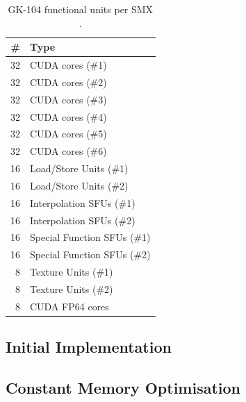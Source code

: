 \documentclass[11pt, oneside, a4paper]{article}
\begin{document}
\begin{table}[tb]
	\caption{GK-104 functional units per SMX \cite{Anand}.}
	\label{tab:funcunits}
	\begin{center}
		\begin{tabular}{rl}
		\hline

		\hline
		\textbf{\#} & \textbf{Type} \\
		\hline
			32 & CUDA cores (\#1) \\
			32 & CUDA cores (\#2) \\
			32 & CUDA cores (\#3) \\
			32 & CUDA cores (\#4) \\
			32 & CUDA cores (\#5) \\
			32 & CUDA cores (\#6) \\
			16 & Load/Store Units (\#1) \\
			16 & Load/Store Units (\#2) \\
			16 & Interpolation SFUs (\#1) \\
			16 & Interpolation SFUs (\#2) \\
			16 & Special Function SFUs (\#1) \\
			16 & Special Function SFUs (\#2) \\
			8 & Texture Units (\#1) \\
			8 & Texture Units (\#2) \\
			8 & CUDA FP64 cores \\
		\hline

		\hline
		\end{tabular}
	\end{center}
\end{table}


\subsection{Initial Implementation} %
\label{sub:initial_implementation}


\subsection{Constant Memory Optimisation} %
\label{sub:constant_memory_optimisation}
\end{document}
